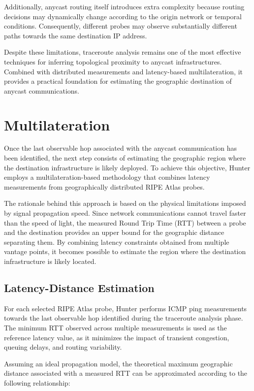 Additionally, anycast routing itself introduces extra complexity because routing decisions may dynamically change according to the origin network or temporal conditions. Consequently, different probes may observe substantially different paths towards the same destination IP address.

Despite these limitations, traceroute analysis remains one of the most effective techniques for inferring topological proximity to anycast infrastructures. Combined with distributed measurements and latency-based multilateration, it provides a practical foundation for estimating the geographic destination of anycast communications.

\section{Multilateration}
\label{sc:hunter_multilateration}

Once the last observable hop associated with the anycast communication has been identified, the next step consists of estimating the geographic region where the destination infrastructure is likely deployed. To achieve this objective, Hunter employs a multilateration-based methodology that combines latency measurements from geographically distributed RIPE Atlas probes.

The rationale behind this approach is based on the physical limitations imposed by signal propagation speed. Since network communications cannot travel faster than the speed of light, the measured Round Trip Time (RTT) between a probe and the destination provides an upper bound for the geographic distance separating them. By combining latency constraints obtained from multiple vantage points, it becomes possible to estimate the region where the destination infrastructure is likely located.

\subsection{Latency-Distance Estimation}

For each selected RIPE Atlas probe, Hunter performs ICMP ping measurements towards the last observable hop identified during the traceroute analysis phase. The minimum RTT observed across multiple measurements is used as the reference latency value, as it minimizes the impact of transient congestion, queuing delays, and routing variability.

Assuming an ideal propagation model, the theoretical maximum geographic distance associated with a measured RTT can be approximated according to the following relationship:

